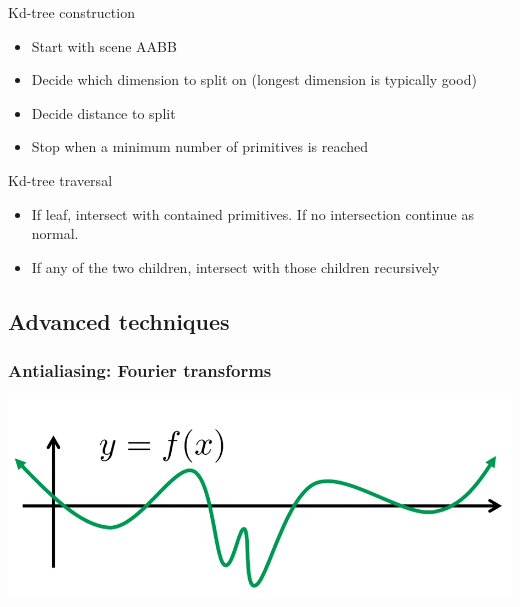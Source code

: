 \documentclass[12pt]{article}
\begin{document}
Kd-tree construction
\begin{itemize}
    \item Start with scene AABB
    \item Decide which dimension to split on (longest dimension is
        typically good)
    \item Decide distance to split
    \item Stop when a minimum number of primitives is reached
\end{itemize}

Kd-tree traversal
\begin{itemize}
    \item If leaf, intersect with contained primitives. If no intersection
        continue as normal.
    \item If any of the two children, intersect with those children recursively
\end{itemize}

\subsection{Advanced techniques}

\subsubsection{Antialiasing: Fourier transforms}

\includegraphics[scale=.5]{images/fourier-fx.png}
\end{document}
